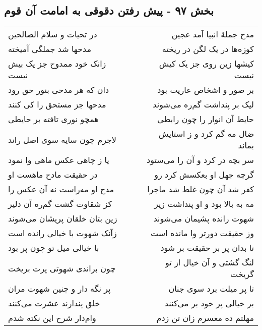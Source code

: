 \begin{center}
\section*{بخش ۹۷ - پیش رفتن دقوقی به امامت آن قوم}
\label{sec:sh097}
\begin{longtable}{l p{0.5cm} r}
در تحیات و سلام الصالحین
&&
مدح جملهٔ انبیا آمد عجین
\\
مدحها شد جملگی آمیخته
&&
کوزه‌ها در یک لگن در ریخته
\\
زانک خود ممدوح جز یک بیش نیست
&&
کیشها زین روی جز یک کیش نیست
\\
دان که هر مدحی بنور حق رود
&&
بر صور و اشخاص عاریت بود
\\
مدحها جز مستحق را کی کنند
&&
لیک بر پنداشت گم‌ره می‌شوند
\\
همچو نوری تافته بر حایطی
&&
حایط آن انوار را چون رابطی
\\
لاجرم چون سایه سوی اصل راند
&&
ضال مه گم کرد و ز استایش بماند
\\
یا ز چاهی عکس ماهی وا نمود
&&
سر بچه در کرد و آن را می‌ستود
\\
در حقیقت مادح ماهست او
&&
گرچه جهل او بعکسش کرد رو
\\
مدح او مه‌راست نه آن عکس را
&&
کفر شد آن چون غلط شد ماجرا
\\
کز شقاوت گشت گم‌ره آن دلیر
&&
مه به بالا بود و او پنداشت زیر
\\
زین بتان خلقان پریشان می‌شوند
&&
شهوت رانده پشیمان می‌شوند
\\
زآنک شهوت با خیالی رانده است
&&
وز حقیقت دورتر وا مانده است
\\
با خیالی میل تو چون پر بود
&&
تا بدان پر بر حقیقت بر شود
\\
چون براندی شهوتی پرت بریخت
&&
لنگ گشتی و آن خیال از تو گریخت
\\
پر نگه دار و چنین شهوت مران
&&
تا پر میلت برد سوی جنان
\\
خلق پندارند عشرت می‌کنند
&&
بر خیالی پر خود بر می‌کنند
\\
وام‌دار شرح این نکته شدم
&&
مهلتم ده معسرم زان تن زدم
\\
\end{longtable}
\end{center}
